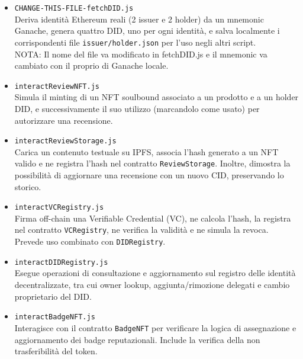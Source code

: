             \begin{itemize}
                \item \texttt{CHANGE-THIS-FILE-fetchDID.js} \\
                Deriva identità Ethereum reali (2 issuer e 2 holder) da un mnemonic Ganache, genera quattro DID, uno per ogni identità, e salva localmente i corrispondenti file \texttt{issuer/holder.json} per l'uso negli altri script.\\
                NOTA: Il nome del file va modificato in fetchDID.js e il mnemonic va cambiato con il proprio di Ganache locale.
                
                \item \texttt{interactReviewNFT.js} \\
                Simula il minting di un NFT soulbound associato a un prodotto e a un holder DID, e successivamente il suo utilizzo (marcandolo come usato) per autorizzare una recensione.
            
                \item \texttt{interactReviewStorage.js} \\
                Carica un contenuto testuale su IPFS, associa l’hash generato a un NFT valido e ne registra l’hash nel contratto \texttt{ReviewStorage}. Inoltre, dimostra la possibilità di aggiornare una recensione con un nuovo CID, preservando lo storico.
            
                \item \texttt{interactVCRegistry.js} \\
                Firma off-chain una Verifiable Credential (VC), ne calcola l’hash, la registra nel contratto \texttt{VCRegistry}, ne verifica la validità e ne simula la revoca. Prevede uso combinato con \texttt{DIDRegistry}.
            
                \item \texttt{interactDIDRegistry.js} \\
                Esegue operazioni di consultazione e aggiornamento sul registro delle identità decentralizzate, tra cui owner lookup, aggiunta/rimozione delegati e cambio proprietario del DID.
            
                \item \texttt{interactBadgeNFT.js} \\
                Interagisce con il contratto \texttt{BadgeNFT} per verificare la logica di assegnazione e aggiornamento dei badge reputazionali. Include la verifica della non trasferibilità del token.
            

\end{itemize}
